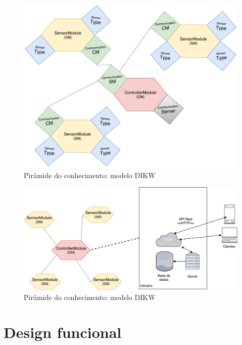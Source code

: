 \begin{figure}[!htb]
	\centering
	\includegraphics[scale=0.45]{esquemas/general-electronic-modules.pdf}
	\caption{Pirâmide do conhecimento: modelo DIKW}
	\label{dikw}
\end{figure}








\newpage

\begin{figure}[!htb]
	\centering
	\includegraphics[scale=0.55]{esquemas/arquitetura_geral.pdf}
	\caption{Pirâmide do conhecimento: modelo DIKW}
	\label{dikw}
\end{figure}




\section{Design funcional}











